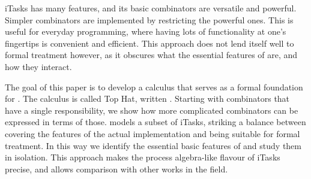 iTasks has many features, and its basic combinators are versatile and powerful.
Simpler combinators are implemented by restricting the powerful ones.
This is useful for everyday programming, where having lots of functionality at one's fingertips is convenient and efficient.
This approach does not lend itself well to formal treatment however, as it obscures what the essential features of \TOP are, and how they interact.

The goal of this paper is to develop a calculus that serves as a formal foundation for \TOP.
The calculus is called Top Hat, written \TOPHAT.
Starting with combinators that have a single responsibility, we show how more complicated combinators can be expressed in terms of those.
\TOPHAT models a subset of iTasks, striking a balance between covering the features of the actual implementation and being suitable for formal treatment.
In this way we identify the essential basic features of \TOP and study them in isolation.
This approach makes the process algebra-like flavour of iTasks precise, and allows comparison with other works in the field.
